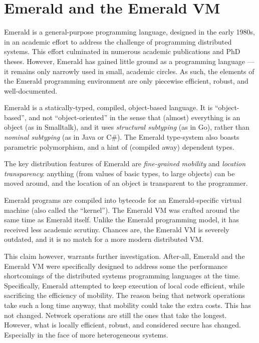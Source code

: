 \section{Emerald and the Emerald VM}

Emerald is a general-purpose programming language, designed in the
early 1980s, in an academic effort to address the challenge of
programming distributed systems. This effort culminated in numerous
academic publications\cite{emerald:tse:1987, emerald:tocs:1988,
emerald:spe:1991} and PhD theses\cite{emerald:phd:norman-c-hutchinson,
emerald:phd:eric-jul, emerald:phd:niels-christian-juul}. However,
Emerald has gained little ground as a programming language --- it
remains only narrowly used in small, academic circles. As such, the
elements of the Emerald programming environment are only piecewise
efficient, robust, and well-documented.

Emerald is a statically-typed, compiled, object-based language. It is
``object-based'', and not ``object-oriented'' in the sense that
(almost) everything is an object (as in Smalltalk), and it uses
\emph{structural subtyping} (as in Go), rather than \emph{nominal
subtyping} (as in Java or C\#). The Emerald type-system also boasts
parametric polymorphism, and a hint of (compiled away) dependent
types.

The key distribution features of Emerald are \emph{fine-grained
mobility} and \emph{location transparency}: anything (from values of
basic types, to large objects) can be moved around, and the location
of an object is transparent to the programmer.

Emerald programs are compiled into bytecode for an Emerald-specific
virtual machine (also called the
``kernel''\cite{emerald:phd:eric-jul}). The Emerald VM was crafted
around the same time as Emerald itself.  Unlike the Emerald
programming model, it has received less academic scrutiny. Chances
are, the Emerald VM is severely outdated, and it is no match for a
more modern distributed VM.

This claim however, warrants further investigation. After-all, Emerald
and the Emerald VM were specifically designed to address some the
performance shortcomings of the distributed systems programming
languages at the time\cite{emerald:phd:eric-jul}. Specifically,
Emerald attempted to keep execution of local code efficient, while
sacrificing the efficiency of mobility. The reason being that network
operations take such a long time anyway, that mobility could take the
extra costs. This has not changed. Network operations are still the
ones that take the longest. However, what is locally efficient,
robust, and considered secure has changed. Especially in the face of
more heterogeneous systems.
